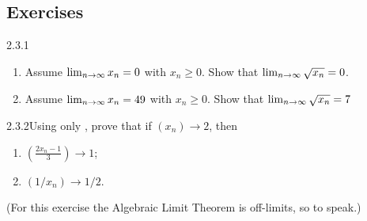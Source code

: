 \renewcommand{\theenumi}{\alph{enumi}}
\renewcommand{\labelenumi}{(\theenumi)}
\subsection{Exercises}

\begin{exercise}
    {2.3.1}
    \begin{enumerate}
        \item Assume \(\lim_{n \rightarrow \infty}x_n = 0\) with \(x_n \geq 0\). Show that \(\lim_{n \rightarrow \infty}\sqrt{x_n} = 0\).
        \item Assume \(\lim_{n \rightarrow \infty}x_n = 49\) with \(x_n \geq 0\). Show that \(\lim_{n \rightarrow \infty}\sqrt{x_n} = 7\)
    \end{enumerate}
\end{exercise}


\begin{exercise}
    {2.3.2}Using only , prove that if \((x_n) \rightarrow 2\), then
    \begin{enumerate}
        \item \(\displaystyle \left(\frac{2x_n - 1}{3}\right) \rightarrow 1\);
        \item \(\displaystyle \left(1 / x_n\right) \rightarrow 1 / 2\).
    \end{enumerate}
    (For this exercise the Algebraic Limit Theorem is off-limits, so to speak.)
\end{exercise}

